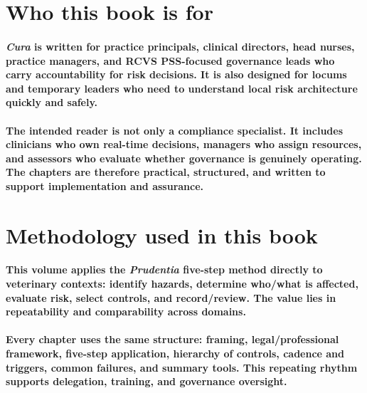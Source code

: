 \section{Who this book is for}

\paragraph{\textit{Cura} is written for practice principals, clinical directors, head nurses, practice managers, and RCVS PSS-focused governance leads who carry accountability for risk decisions. It is also designed for locums and temporary leaders who need to understand local risk architecture quickly and safely.}

\paragraph{The intended reader is not only a compliance specialist. It includes clinicians who own real-time decisions, managers who assign resources, and assessors who evaluate whether governance is genuinely operating. The chapters are therefore practical, structured, and written to support implementation and assurance.}

\section{Methodology used in this book}

\paragraph{This volume applies the \textit{Prudentia} five-step method directly to veterinary contexts: identify hazards, determine who/what is affected, evaluate risk, select controls, and record/review. The value lies in repeatability and comparability across domains.}

\paragraph{Every chapter uses the same structure: framing, legal/professional framework, five-step application, hierarchy of controls, cadence and triggers, common failures, and summary tools. This repeating rhythm supports delegation, training, and governance oversight.}


